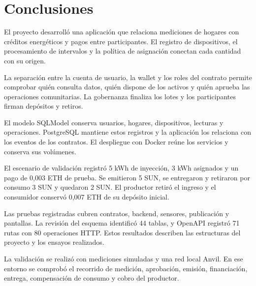 \section{Conclusiones}
El proyecto desarrolló una aplicación que relaciona mediciones de hogares con créditos energéticos y pagos entre participantes. El registro de dispositivos, el procesamiento de intervalos y la política de asignación conectan cada cantidad con su origen.

La separación entre la cuenta de usuario, la wallet y los roles del contrato permite comprobar quién consulta datos, quién dispone de los activos y quién aprueba las operaciones comunitarias. La gobernanza finaliza los lotes y los participantes firman depósitos y retiros.

El modelo SQLModel conserva usuarios, hogares, dispositivos, lecturas y operaciones. PostgreSQL mantiene estos registros y la aplicación los relaciona con los eventos de los contratos. El despliegue con Docker reúne los servicios y conserva sus volúmenes.

El escenario de validación registró 5 kWh de inyección, 3 kWh asignados y un pago de 0,003 ETH de prueba. Se emitieron 5 SUN, se entregaron y retiraron por consumo 3 SUN y quedaron 2 SUN. El productor retiró el ingreso y el consumidor conservó 0,007 ETH de su depósito inicial.

Las pruebas registradas cubren contratos, backend, sensores, publicación y pantallas. La revisión del esquema identificó 44 tablas, y OpenAPI registró 71 rutas con 80 operaciones HTTP. Estos resultados describen las estructuras del proyecto y los ensayos realizados.

La validación se realizó con mediciones simuladas y una red local Anvil. En ese entorno se comprobó el recorrido de medición, aprobación, emisión, financiación, entrega, compensación de consumo y cobro del productor.
